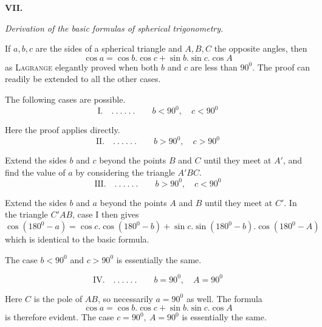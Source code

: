 %
\par\medskip{}
\centerline{\textbf{VII.}}\nobreak\smallskip
\begin{center}\textit{Derivation of the basic formulas of spherical trigonometry.}\end{center}
\hspace*{\parindent}If \(a,b,c\) are the sides of a spherical triangle and \(A,B,C\) the opposite angles, then
\[
\cos a=\cos b.\cos c+\sin b.\sin c.\cos A
\]
as \textsc{Lagrange} elegantly proved when both \(b\) and \(c\) are less than \(90^0\). The proof can readily be extended to all the other cases.

The following cases are possible.
\[
\text{I.}\quad .\ .\ .\ .\ .\ .\qquad b<90^0,\quad c<90^0
\]
\par
Here the proof applies directly.
\[
\text{II.}\quad .\ .\ .\ .\ .\ .\qquad b>90^0,\quad c>90^0
\]
\par
Extend the sides \(b\) and \(c\) beyond the points \(B\) and \(C\) until they meet at \(A'\), and find the value of \(a\) by considering the triangle \(A'BC\).
\[
\text{III.}\quad .\ .\ .\ .\ .\ .\qquad b>90^0,\quad c<90^0
\]
\par
Extend the sides \(b\) and \(a\) beyond the points \(A\) and \(B\) until they meet at \(C'\). In the triangle \(C'AB\), case I then gives
\[
\cos(180^0-a)=\cos c.\cos(180^0-b)+\sin c.\sin(180^0-b).\cos(180^0-A)
\]
which is identical to the basic formula.

The case \(b<90^0\) and \(c>90^0\) is essentially the same.
\par{}
\[
\text{IV.}\quad .\ .\ .\ .\ .\ .\qquad b=90^0,\quad A=90^0
\]
\par
Here \(C\) is the pole of \(AB\), so necessarily \(a=90^0\) as well. The formula
\[
\cos a=\cos b.\cos c+\sin b.\sin c.\cos A
\]
is therefore evident. The case \(c=90^0,\ A=90^0\) is essentially the same.
